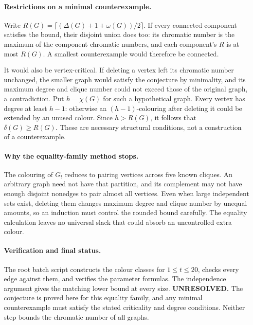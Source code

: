 \documentclass[11pt,a4paper]{article}
\begin{document}
\paragraph{Restrictions on a minimal counterexample.}
Write $R(G)=\lceil(\Delta(G)+1+\omega(G))/2\rceil$. If every connected
component satisfies the bound, their disjoint union does too: its
chromatic number is the maximum of the component chromatic numbers,
and each component's $R$ is at most $R(G)$. A smallest counterexample
would therefore be connected.

It would also be vertex-critical. If deleting a vertex left its chromatic
number unchanged, the smaller graph would satisfy the conjecture by
minimality, and its maximum degree and clique number could not exceed
those of the original graph, a contradiction. Put $h=\chi(G)$ for such
a hypothetical graph. Every vertex has degree at least $h-1$: otherwise
an $(h-1)$-colouring after deleting it could be extended by an unused
colour. Since $h>R(G)$, it follows that $\delta(G)\ge R(G)$. These are
necessary structural conditions, not a construction of a counterexample.

\paragraph{Why the equality-family method stops.}
The colouring of $G_t$ reduces to pairing vertices across five known
cliques. An arbitrary graph need not have that partition, and its
complement may not have enough disjoint nonedges to pair almost all
vertices. Even when large independent sets exist, deleting them changes
maximum degree and clique number by unequal amounts, so an induction
must control the rounded bound carefully. The equality calculation
leaves no universal slack that could absorb an uncontrolled extra colour.

\paragraph{Verification and final status.}
The root batch script constructs the colour classes for $1\le t\le20$,
checks every edge against them, and verifies the parameter formulas.
The independence argument gives the matching lower bound at every size.
\textbf{UNRESOLVED.} The conjecture is proved here for this equality family,
and any minimal counterexample must satisfy the stated criticality and
degree conditions. Neither step bounds the chromatic number of all graphs.
\end{document}
